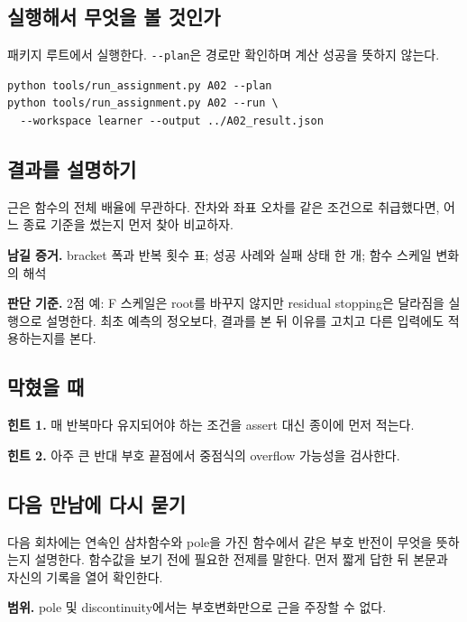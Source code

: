 \documentclass[
  10pt,
  a4paper,
]{article}
\begin{document}
\newpage

\subsection{실행해서 무엇을 볼
것인가}\label{uxc2e4uxd589uxd574uxc11c-uxbb34uxc5c7uxc744-uxbcfc-uxac83uxc778uxac00}

패키지 루트에서 실행한다. \texttt{-\/-plan}은 경로만 확인하며 계산
성공을 뜻하지 않는다.

\begin{verbatim}
python tools/run_assignment.py A02 --plan
python tools/run_assignment.py A02 --run \
  --workspace learner --output ../A02_result.json
\end{verbatim}

\subsection{결과를
설명하기}\label{uxacb0uxacfcuxb97c-uxc124uxba85uxd558uxae30}

근은 함수의 전체 배율에 무관하다. 잔차와 좌표 오차를 같은 조건으로
취급했다면, 어느 종료 기준을 썼는지 먼저 찾아 비교하자.

\textbf{남길 증거.} bracket 폭과 반복 횟수 표; 성공 사례와 실패 상태 한
개; 함수 스케일 변화의 해석

\textbf{판단 기준.} 2점 예: F 스케일은 root를 바꾸지 않지만 residual
stopping은 달라짐을 실행으로 설명한다. 최초 예측의 정오보다, 결과를 본
뒤 이유를 고치고 다른 입력에도 적용하는지를 본다.

\subsection{막혔을 때}\label{uxb9c9uxd614uxc744-uxb54c}

\textbf{힌트 1.} 매 반복마다 유지되어야 하는 조건을 assert 대신 종이에
먼저 적는다.

\textbf{힌트 2.} 아주 큰 반대 부호 끝점에서 중점식의 overflow 가능성을
검사한다.

\subsection{다음 만남에 다시
묻기}\label{uxb2e4uxc74c-uxb9ccuxb0a8uxc5d0-uxb2e4uxc2dc-uxbb3buxae30}

다음 회차에는 연속인 삼차함수와 pole을 가진 함수에서 같은 부호 반전이
무엇을 뜻하는지 설명한다. 함수값을 보기 전에 필요한 전제를 말한다. 먼저
짧게 답한 뒤 본문과 자신의 기록을 열어 확인한다.

\textbf{범위.} pole 및 discontinuity에서는 부호변화만으로 근을 주장할 수
없다.
\end{document}
